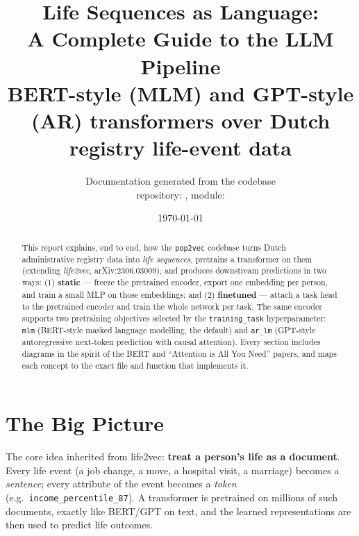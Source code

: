 \documentclass[11pt,a4paper]{article}
\title{\textbf{Life Sequences as Language:\\
A Complete Guide to the \code{pop2vec} LLM Pipeline}\\[2mm]
\large BERT-style (MLM) and GPT-style (AR) transformers over Dutch registry life-event data}
\author{Documentation generated from the codebase\\
\small repository: \code{life-sequencing-dutch}, module: \code{pop2vec/llm}}
\date{\today}
\newcommand{\code}[1]{\texttt{\small #1}}
\begin{document}
\maketitle

\begin{abstract}
\noindent
This report explains, end to end, how the \code{pop2vec} codebase turns Dutch
administrative registry data into \emph{life sequences}, pretrains a transformer
on them (extending \emph{life2vec}, arXiv:2306.03009), and produces downstream
predictions in two ways: (1) \textbf{static} --- freeze the pretrained encoder,
export one embedding per person, and train a small MLP on those embeddings; and
(2) \textbf{finetuned} --- attach a task head to the pretrained encoder and train
the whole network per task. The same encoder supports two pretraining objectives
selected by the \code{training\_task} hyperparameter: \code{mlm} (BERT-style
masked language modelling, the default) and \code{ar\_lm} (GPT-style
autoregressive next-token prediction with causal attention). Every section
includes diagrams in the spirit of the BERT and ``Attention is All You Need''
papers, and maps each concept to the exact file and function that implements it.
\end{abstract}

\tableofcontents
\clearpage

\section{The Big Picture}

The core idea inherited from life2vec: \textbf{treat a person's life as a
document}. Every life event (a job change, a move, a hospital visit, a marriage)
becomes a \emph{sentence}; every attribute of the event becomes a \emph{token}
(e.g.\ \code{income\_percentile\_87}). A transformer is pretrained on millions of
such documents, exactly like BERT/GPT on text, and the learned representations
are then used to predict life outcomes.
\end{document}
